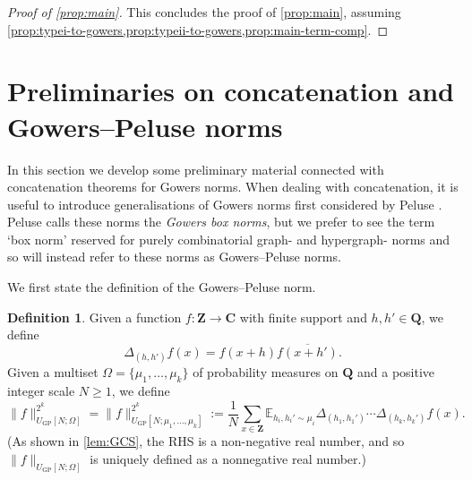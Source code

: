 \documentclass[11pt,reqno]{amsart}
\numberwithin{equation}{section}
\theoremstyle{definition}
\newtheorem{definition}[theorem]{Definition}
\theoremstyle{remark}
\newcommand{\snorm}[1]{\lVert#1\rVert}
\newcommand{\mb}{\mathbb}
\renewcommand{\ge}{\geqslant}
\newcommand\Z{\mathbf{Z}}
\newcommand\Q{\mathbf{Q}}
\newcommand\C{\mathbf{C}}
\newcommand\E{\mb{E}}
\newcommand\GP{\operatorname{GP}}
\begin{document}
\begin{proof}[Proof of \cref{prop:main}]
This concludes the proof of \cref{prop:main}, assuming \cref{prop:typei-to-gowers,prop:typeii-to-gowers,prop:main-term-comp}.
\end{proof}


\section{Preliminaries on concatenation and Gowers--Peluse norms}\label{section5}

In this section we develop some preliminary material connected with concatenation theorems for Gowers norms. When dealing with concatenation, it is useful to introduce generalisations of Gowers norms first considered by Peluse \cite[Definition 2.1]{Pel20}. Peluse calls these norms the \emph{Gowers box norms}, but we prefer to see the term `box norm' reserved for purely combinatorial graph- and hypergraph- norms and so will instead refer to these norms as Gowers--Peluse norms. 

We first state the definition of the Gowers--Peluse norm. 

\begin{definition}\label{def:box}
Given a function $f: \Z \to \C$ with finite support and $h,h'\in \Q$, we define 
\begin{equation}\label{double-difference} \Delta_{(h,h')}f(x) = f(x+h)\overline{f(x+h')}.\end{equation}
Given a multiset $\Omega = \{ \mu_1,\dots, \mu_k\}$ of probability measures on $\Q$ and a positive integer scale $N \ge 1$, we define 
\begin{equation}\label{gp-explicit-def} \snorm{f}_{U_{\GP}[N; \Omega]}^{2^k} = \snorm{f}_{U_{\GP}[N; \mu_1,\dots, \mu_k]}^{2^k} := \frac{1}{N}\sum_{x \in \Z} \E_{h_i,h_i' \sim \mu_i}\Delta_{(h_1,h_1')}\cdots\Delta_{(h_k,h_k')}f(x).\end{equation}
(As shown in \cref{lem:GCS}, the RHS is a non-negative real number, and so $\snorm{f}_{U_{\GP}[N; \Omega]}$ is uniquely defined as a nonnegative real number.)

\end{definition}
\end{document}

